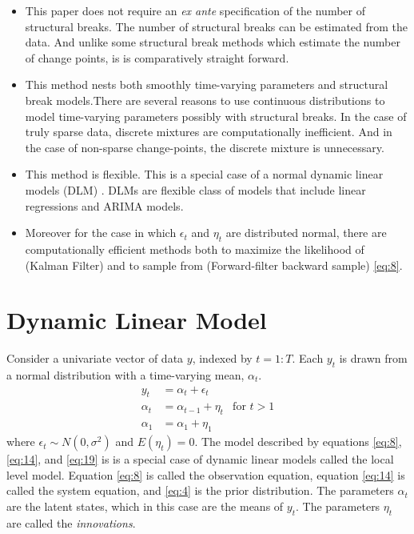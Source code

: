 \documentclass{article}
\begin{document}
\begin{itemize}
\item This paper does not require an \textit{ex ante} specification of
  the number of structural breaks. 
  The number of structural breaks can be estimated from the data.
  And unlike some structural break methods which estimate the number of change points, is is comparatively straight forward.
\item This method nests both smoothly time-varying parameters and
  structural break models.There are several reasons to use continuous
  distributions to model time-varying parameters possibly with
  structural breaks.  In the case of truly sparse data, discrete
  mixtures are computationally inefficient.  And in the case of
  non-sparse change-points, the discrete mixture is unnecessary.
\item This method is flexible.  This is a special case of a normal
  dynamic linear models
  (DLM) \parencites{WestHarrison1997}{DurbinKoopman2012}{CommandeurKoopman2007}{ShumwayStoffer2010}.
  DLMs are flexible class of models that include linear regressions
  and ARIMA models.
\item Moreover for the case in which $\epsilon_{t}$ and $\eta_{t}$ are distributed normal, there are computationally efficient methods both to maximize the likelihood of (Kalman Filter) and to sample from (Forward-filter backward sample) \eqref{eq:8}.
\end{itemize}

\section{Dynamic Linear Model}

Consider a univariate vector of data $y$, indexed by $t = 1:T$.
Each $y_{t}$ is drawn from a normal distribution with a time-varying mean, $\alpha_{t}$.
\begin{align}
  \label{eq:8}
  y_t &= \alpha_t + \epsilon_t \\
  \label{eq:14}
  \alpha_t &= \alpha_{t-1} + \eta_{t} & \text{for $t > 1$} \\
  \label{eq:19}
  \alpha_1 &= \alpha_{1} + \eta_{1}
\end{align}
where $\epsilon_{t} \sim N(0, \sigma^{2})$ and $E(\eta_{t}) = 0$.
The model described by equations \eqref{eq:8}, \eqref{eq:14}, and \eqref{eq:19} is 
is a special case of dynamic linear models called the local level model.
Equation \eqref{eq:8} is called the observation equation, 
equation \eqref{eq:14} is called the system equation,
and \eqref{eq:4} is the prior distribution.
The parameters $\alpha_{t}$ are the latent states, which in this case are the means of $y_{t}$.
The parameters $\eta_{t}$ are called the \textit{innovations}.
\end{document}
